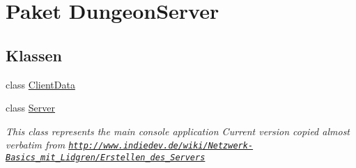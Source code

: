 \hypertarget{namespace_dungeon_server}{\section{Paket Dungeon\-Server}
\label{namespace_dungeon_server}
}
\subsection*{Klassen}
\begin{DoxyCompactItemize}
\item 
class \hyperlink{class_dungeon_server_1_1_client_data}{Client\-Data}
\item 
class \hyperlink{class_dungeon_server_1_1_server}{Server}
\begin{DoxyCompactList}\small\item\em This class represents the main console application Current version copied almost verbatim from \href{http://www.indiedev.de/wiki/Netzwerk-Basics_mit_Lidgren/Erstellen_des_Servers}{\tt http\-://www.\-indiedev.\-de/wiki/\-Netzwerk-\/\-Basics\-\_\-mit\-\_\-\-Lidgren/\-Erstellen\-\_\-des\-\_\-\-Servers} \end{DoxyCompactList}\end{DoxyCompactItemize}
